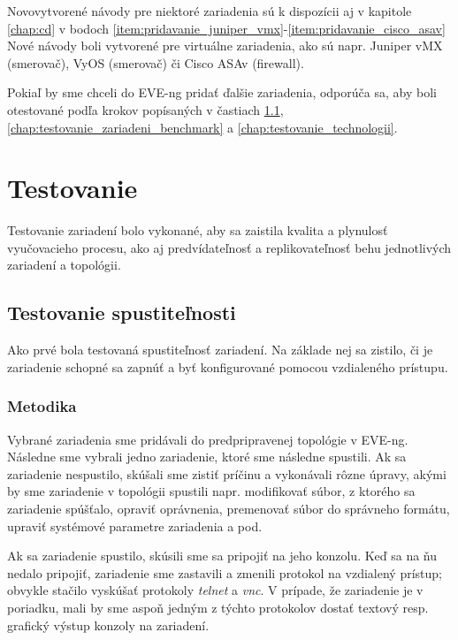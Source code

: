 Novovytvorené návody pre niektoré zariadenia sú k dispozícii aj v kapitole \ref{chap:cd} v bodoch \ref{item:pridavanie_juniper_vmx}-\ref{item:pridavanie_cisco_asav} Nové návody boli vytvorené pre virtuálne zariadenia, ako sú napr. Juniper vMX (smerovač), VyOS (smerovač) či Cisco ASAv (firewall).

Pokiaľ by sme chceli do EVE-ng pridať ďalšie zariadenia, odporúča sa, aby boli otestované podľa krokov popísaných v častiach \ref{chap:test_spust}, \ref{chap:testovanie_zariadeni_benchmark} a \ref{chap:testovanie_technologii}.






\section{Testovanie}
\label{chap:testovanie_zariadeni}

Testovanie zariadení bolo vykonané, aby sa zaistila kvalita a plynulosť vyučovacieho procesu, ako aj predvídateľnosť a replikovateľnosť behu jednotlivých zariadení a topológii.




\subsection{Testovanie spustiteľnosti}
\label{chap:test_spust}

Ako prvé bola testovaná spustiteľnosť zariadení. Na základe nej sa zistilo, či je zariadenie schopné sa zapnúť a byť konfigurované pomocou vzdialeného prístupu.



\subsubsection{Metodika}

Vybrané zariadenia sme pridávali do predpripravenej topológie v EVE-ng. Následne sme vybrali jedno zariadenie, ktoré sme následne spustili. Ak sa zariadenie nespustilo, skúšali sme zistiť príčinu a vykonávali rôzne úpravy, akými by sme zariadenie v topológii spustili napr. modifikovať súbor, z ktorého sa zariadenie spúšťalo, opraviť oprávnenia, premenovať súbor do správneho formátu, upraviť systémové parametre zariadenia a pod.

Ak sa zariadenie spustilo, skúsili sme sa pripojiť na jeho konzolu. Keď sa na ňu nedalo pripojiť, zariadenie sme zastavili a zmenili protokol na vzdialený prístup; obvykle stačilo vyskúšať protokoly \emph{telnet} a \emph{vnc}. V prípade, že zariadenie je v poriadku, mali by sme aspoň jedným z týchto protokolov dostať textový resp. grafický výstup konzoly na zariadení.

